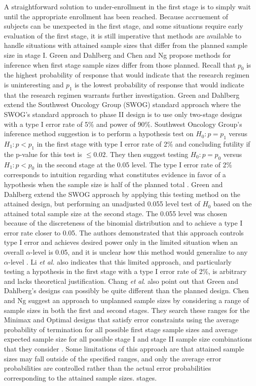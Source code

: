 \documentclass[12pt]{report}\usepackage[]{graphicx}\usepackage[]{color}
\newlength{\li}\setlength{\li}{14.48pt}
\newlength{\di}\setlength{\di}{-3.5mm}
\begin{document}
\indent A straightforward solution to under-enrollment in the first stage is to simply wait until the appropriate enrollment has been reached. Because accruement of subjects can be unexpected in the first stage, and some situations require early evaluation of the first stage, it is still imperative that methods are available to handle situations with attained sample sizes that differ from the planned sample size in stage I. Green and Dahlberg \cite{Green} and Chen and Ng \cite{Chen} propose methods for inference when first stage sample sizes differ from those planned. Recall that $p_0$ is the highest probability of response that would indicate that the research regimen is uninteresting and $p_1$ is the lowest probability of response that would indicate that the research regimen warrants further investigation. Green and Dahlberg extend the Southwest Oncology Group (SWOG) standard approach where the SWOG's standard approach to phase II design is to use only two-stage designs with a type I error rate of 5\% and power of 90\%. Southwest Oncology Group's inference method suggestion is to perform a hypothesis test on $H_0: p=p_1$ versus $H_1: p < p_1$ in the first stage with type I error rate of 2\% and concluding futility if the p-value for this test is $\leq 0.02$. They then suggest testing $H_0: p=p_0$ versus $H_1: p < p_0$ in the second stage at the 0.05 level. The type I error rate of 2\% corresponds to intuition regarding what constitutes evidence in favor of a hypothesis when the sample size is half of the planned total \cite{Green}. Green and Dahlberg extend the SWOG approach by applying this testing method on the attained design, but performing an unadjusted 0.055 level test of $H_0$ based on the attained total sample size at the second stage. The 0.055 level was chosen because of the discreteness of the binomial distribution and to achieve a type I error rate closer to 0.05. The authors demonstrated that this approach controls type I error and achieves desired power only in the limited situation when an overall $\alpha$-level is 0.05, and it is unclear how this method would generalize to any $\alpha$-level \cite{Li}. Li \textit{et al.} also indicates that this limited approach, and particularly testing a hypothesis in the first stage with a type I error rate of 2\%, is arbitrary and lacks theoretical justification. Chang \textit{et al}. \cite{Chang} also point out that Green and Dahlberg's designs can possibly be quite different than the planned design. Chen and Ng \cite{Chen} suggest an approach to unplanned sample sizes by considering a range of sample sizes in both the first and second stages. They search these ranges for the Minimax and Optimal designs that satisfy error constraints using the average probability of termination for all possible first stage sample sizes and average expected sample size for all possible stage I and stage II sample size combinations that they consider \cite{Chen}. Some limitations of this approach are that attained sample sizes may fall outside of the specified ranges, and only the average error probabilities are controlled rather than the actual error probabilities corresponding to the attained sample sizes.  stages.   
\end{document}
